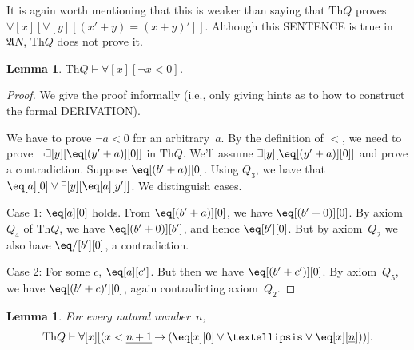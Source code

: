\documentclass[10pt,a4paper]{article}
\newcommand*{\olup}[1]{\MakeUppercase{#1}}
\theoremstyle{plain}
\newtheorem{lem}[thm]{Lemma}
\theoremstyle{definition}
\theoremstyle{remark}
\newcommand*{\ollabel}[1]{\label{#1}}
\providecommand{\lif}{\mathbin{\rightarrow}}
\providecommand{\lforall}{\mathord{\forall}}
\providecommand{\lexists}{\mathord{\exists}}
\providecommand{\Proves}{\mathrel{\vdash}}
\providecommand{\Obj}{}
\providecommand{\Struct}{\ensuremath{\mathfrak{A}}}
\providecommand{\Th}{\ensuremath{\mathrm{Th}}}
\providecommand{\num}[1]{\underline{#1}}
\begin{document}
It is again worth mentioning that this is weaker than saying that
$\Th{Q}$ proves $\lforall[x][\lforall[y][(x' + y) = (x + y)']]$.
Although this \olup{sentence} is true in~$\Struct{N}$, $\Th{Q}$ does not
prove it.

\begin{lem}
\ollabel{lem:less-zero}
$\Th{Q} \Proves \lforall[x][\lnot x < \Obj 0]$.
\end{lem}

\begin{proof}
We give the proof informally (i.e., only giving hints as to
how to construct the formal \olup{derivation}).

We have to prove $\lnot a < \Obj 0$ for an arbitrary~$a$. By the
definition of $<$, we need to prove $\lnot
\lexists[y][\eq[(y'+a)][\Obj 0]]$ in $\Th{Q}$. We'll assume
$\lexists[y][\eq[(y'+a)][\Obj 0]]$ and prove a contradiction. Suppose
$\eq[(b'+a)][\Obj 0]$. Using $Q_3$, we
have that $\eq[a][\Obj 0] \lor \lexists[y][\eq[a][y']]$. We
distinguish cases. 

Case 1: $\eq[a][\Obj 0]$ holds. From $\eq[(b'+a)][\Obj 0]$, we have
$\eq[(b' + \Obj 0)][\Obj 0]$. By axiom~$Q_4$ of $\Th{Q}$, we have
$\eq[(b' + \Obj 0)][b']$, and hence $\eq[b'][\Obj 0]$. But by
axiom~$Q_2$ we also have $\eq/[b'][\Obj 0]$, a contradiction. 

Case 2: For some $c$, $\eq[a][c']$. But then we have $\eq[(b' +
c')][\Obj 0]$. By axiom~$Q_5$, we have $\eq[(b' + c)'][\Obj 0]$, again
contradicting axiom~$Q_2$.
\end{proof}

\begin{lem}
\ollabel{lem:less-nsucc}
For every natural number~$n$, 
  \[
  \Th{Q} \Proves
  \lforall[x][(x < \num {n+1} \lif (\eq[x][\Obj 0] \lor \dots \lor
    \eq[x][\num n]))].
  \]
\end{lem}
\end{document}
